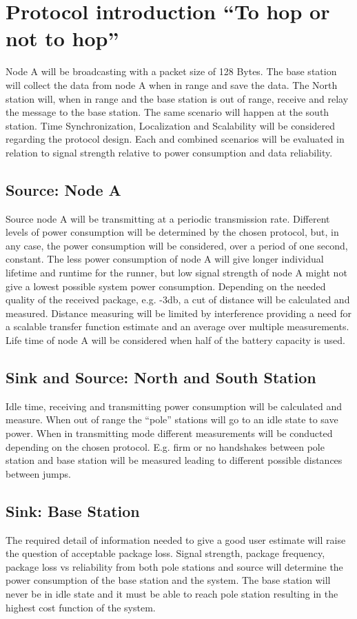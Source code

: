 \section{Protocol introduction “To hop or not to hop”}
Node A will be broadcasting with a packet size of 128 Bytes. The base station will collect the data from node A when in range and save the data. The North station will, when in range and the base station is out of range, receive and relay the message to the base station. The same scenario will happen at the south station. Time Synchronization, Localization and Scalability will be considered regarding the protocol design. Each and combined scenarios will be evaluated in relation to signal strength relative to power consumption and data reliability. 

\subsection{Source: Node A}
Source node A will be transmitting at a periodic transmission rate. Different levels of power consumption will be determined by the chosen protocol, but, in any case, the power consumption will be considered, over a period of one second, constant. The less power consumption of node A will give longer individual lifetime and runtime for the runner, but low signal strength of node A might not give a lowest possible system power consumption. Depending on the needed quality of the received package, e.g. -3db, a cut of distance will be calculated and measured. Distance measuring will be limited by interference providing a need for a scalable transfer function estimate and an average over multiple measurements. Life time of node A will be considered when half of the battery capacity is used.

\subsection{Sink and Source: North and South Station}
Idle time, receiving and transmitting power consumption will be calculated and measure. When out of range the “pole” stations will go to an idle state to save power. When in transmitting mode different measurements will be conducted depending on the chosen protocol. E.g. firm or no handshakes between pole station and base station will be measured leading to different possible distances between jumps.

\subsection{Sink: Base Station}
The required detail of information needed to give a good user estimate will raise the question of acceptable package loss. Signal strength, package frequency, package loss vs reliability from both pole stations and source will determine the power consumption of the base station and the system. The base station will never be in idle state and it must be able to reach pole station resulting in the highest cost function of the system. 

